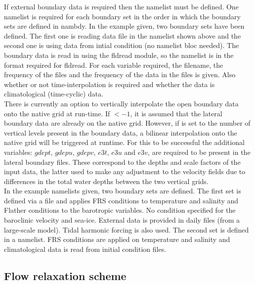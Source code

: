 \documentclass[../main/NEMO_manual]{subfiles}
\begin{document}
If external boundary data is required then the  namelist must be defined.
One  namelist is required for each boundary set in the order in which
the boundary sets are defined in nambdy.
In the example given, two boundary sets have been defined. The first one is reading data file in the  namelist shown above 
and the second one is using data from intial condition (no namelist bloc needed).
The boundary data is read in using the fldread module,
so the  namelist is in the format required for fldread.
For each variable required, the filename, the frequency of the files and
the frequency of the data in the files is given.
Also whether or not time-interpolation is required and whether the data is climatological (time-cyclic) data.\\

There is currently an option to vertically interpolate the open boundary data onto the native grid at run-time.
If  $< -1$, it is assumed that the lateral boundary data are already on the native grid. 
However, if  is set to the number of vertical levels present in the boundary data, 
a bilinear interpolation onto the native grid will be triggered at runtime. 
For this to be successful the additional variables: $gdept$, $gdepu$, $gdepv$, $e3t$, $e3u$ and $e3v$, are required to be present in the lateral boundary files. 
These correspond to the depths and scale factors of the input data, 
the latter used to make any adjustment to the velocity fields due to differences in the total water depths between the two vertical grids.\\

In the example namelists given, two boundary sets are defined.
The first set is defined via a file and applies FRS conditions to temperature and salinity and
Flather conditions to the barotropic variables. No condition specified for the baroclinic velocity and sea-ice.
External data is provided in daily files (from a large-scale model).
Tidal harmonic forcing is also used.
The second set is defined in a namelist.
FRS conditions are applied on temperature and salinity and climatological data is read from initial condition files. 

\subsection{Flow relaxation scheme}
\label{subsec:BDY_FRS_scheme}
\end{document}
